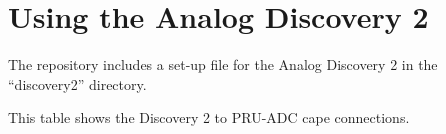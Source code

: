 \chapter{Using the Analog Discovery 2}

The repository includes a set-up file for the Analog Discovery 2 in the ``discovery2'' directory.

This table shows the Discovery 2 to PRU-ADC cape connections.

